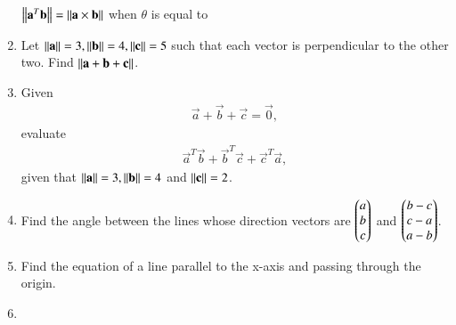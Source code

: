 \begin{enumerate}[label=\arabic*.,ref=\thesubsection.\theenumi]
$\left\lVert\mathbf{a}^T\mathbf{b}\right\rVert = \left\lVert\mathbf{a} \times \mathbf{b}\right\rVert$ when $\theta$ is equal to 
\begin{enumerate}[itemsep = 2pt]
\end{enumerate}
\item Let $\left\lVert\mathbf{a}\right\rVert = 3, \left\lVert\mathbf{b}\right\rVert= 4, \left\lVert\mathbf{c}\right\rVert = 5$ such that each vector is perpendicular to the other two.  Find $\left\lVert\mathbf{a}+\mathbf{b}+\mathbf{c}\right\rVert$.
\item Given 
\begin{align}
 \vec{a}+\vec{b}+\vec{c} = \vec{0}, 
\end{align}
evaluate 
\begin{align}
 \vec{a}^T\vec{b}+\vec{b}^T\vec{c}+\vec{c}^T\vec{a},
\end{align}
given that $\left\lVert \mathbf{a}\right\rVert=3, \left\lVert \mathbf{b}\right\rVert= 4$ and $\left\lVert \mathbf{c}\right\rVert = 2 $.
%
\item Find the angle between the lines whose direction vectors are $\begin{pmatrix}a\\b\\c\end{pmatrix}$ and $\begin{pmatrix}b-c\\c-a\\a-b\end{pmatrix}$.
\item Find the equation of a line parallel to the x-axis and passing through the origin.
\item 
%
\end{enumerate}
